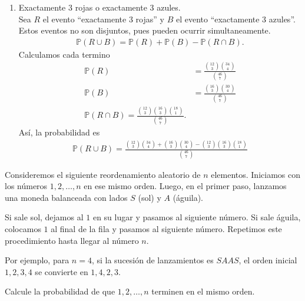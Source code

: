 \documentclass[12pt,a4paper]{article}
\begin{document}
\begin{solucion}
\begin{enumerate}
            Entonces
            \begin{align*}
                \mathbb{P}=\frac{\binom{12}{7}+\binom{16}{7}+\binom{18}{7}}{\binom{46}{7}}.
            \end{align*}
            \item[(d)] Exactamente 3 rojas o exactamente 3 azules.\\
            Sea $R$ el evento “exactamente 3 rojas” y $B$ el evento “exactamente 3 azules”.
            Estos eventos no son disjuntos, pues pueden ocurrir simultaneamente.
            \begin{align*}
                \mathbb{P}(R\cup B)=\mathbb{P}(R)+\mathbb{P}(B)-\mathbb{P}(R\cap B).
            \end{align*}
            Calculamos cada termino
            \begin{align*}
                \mathbb{P}(R)&=\frac{\binom{12}{3}\binom{34}{4}}{\binom{46}{7}}\\
                \mathbb{P}(B)&=\frac{\binom{16}{3}\binom{30}{4}}{\binom{46}{7}}\\
                \mathbb{P}(R\cap B)=\frac{\binom{12}{3}\binom{16}{3}\binom{18}{1}}{\binom{46}{7}}.
            \end{align*}
            Así, la probabilidad es
            \begin{align*}
                \mathbb{P}(R\cup B)=\frac{\binom{12}{3}\binom{34}{4}+\binom{16}{3}\binom{30}{4}-\binom{12}{3}\binom{16}{3}\binom{18}{1}}{\binom{46}{7}}
            \end{align*}
        \end{enumerate}
    \end{solucion}

    \begin{mdframed}[style=mdbluebox,frametitle={Ejercicio 8}]
        Consideremos el siguiente reordenamiento aleatorio de $n$ elementos. 
        Iniciamos con los números $1,2,\dots,n$ en ese mismo orden. Luego, en el primer paso, 
        lanzamos una moneda balanceada con lados $S$ (sol) y $A$ (águila). 

        Si sale sol, dejamos al $1$ en su lugar y pasamos al siguiente número. 
        Si sale águila, colocamos $1$ al final de la fila y pasamos al siguiente número. 
        Repetimos este procedimiento hasta llegar al número $n$. 

        Por ejemplo, para $n=4$, si la sucesión de lanzamientos es $S A A S$, 
        el orden inicial $1,2,3,4$ se convierte en $1,4,2,3$.

        Calcule la probabilidad de que $1,2,\dots,n$ terminen en el mismo orden.
    \end{mdframed}
\end{document}
